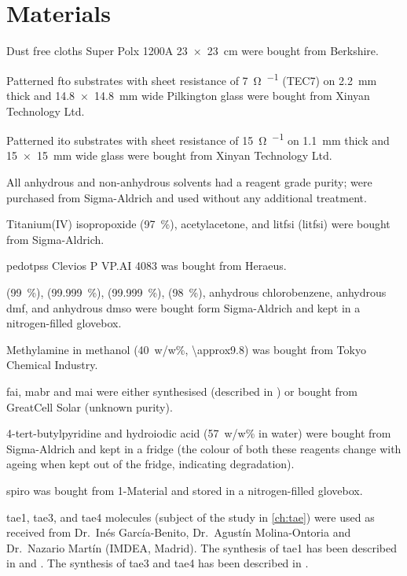


\section{Materials}
	Dust free cloths Super Polx 1200A \SI{23x23}{\cm} were bought from Berkshire.

	Patterned \gls{fto} substrates with sheet resistance of \SI{7}{\ohm\per\sq} (TEC7) on \SI{2.2}{\mm} thick and \SI{14.8x14.8}{\mm} wide Pilkington glass were bought from Xinyan Technology Ltd.

	Patterned \gls{ito} substrates with sheet resistance of \SI{15}{\ohm\per\sq} on \SI{1.1}{\mm} thick and \SI{15x15}{\mm} wide glass were bought from Xinyan Technology Ltd.

	All anhydrous and non-anhydrous solvents had a reagent grade purity; were purchased from Sigma-Aldrich and used without any additional treatment.

	Titanium(IV) isopropoxide (97~\%), acetylacetone, and \glsdesc{litfsi} (\gls{litfsi}) were bought from Sigma-Aldrich.

	\Gls{pedotpss} Clevios P VP.AI 4083 was bought from Heraeus.

	 (99~\%),  (99.999~\%),  (99.999~\%),  (98~\%), anhydrous chlorobenzene, anhydrous \gls{dmf}, and anhydrous \gls{dmso} were bought form Sigma-Aldrich and kept in a nitrogen-filled glovebox.

	Methylamine in methanol (40~w/w\%, \SI{\approx9.8}{\Molar}) was bought from Tokyo Chemical Industry.

	\Gls{fai}, \gls{mabr} and \gls{mai} were either synthesised (described in ) or bought from GreatCell Solar (unknown purity).

	4-tert-butylpyridine and hydroiodic acid (57~w/w\% in water) were bought from Sigma-Aldrich and kept in a fridge (the colour of both these reagents change with ageing when kept out of the fridge, indicating degradation).

	\Gls{spiro} was bought from 1-Material and stored in a nitrogen-filled glovebox.

	\Gls{tae1}, \gls{tae3}, and \gls{tae4} molecules (subject of the study in \cref{ch:tae}) were used as received from Dr.\ Inés García-Benito, Dr.\ Agustín Molina-Ontoria and Dr.\ Nazario Martín (IMDEA, Madrid).
	The synthesis of \gls{tae1} has been described in  and .
	The synthesis of \gls{tae3} and \gls{tae4} has been described in .

